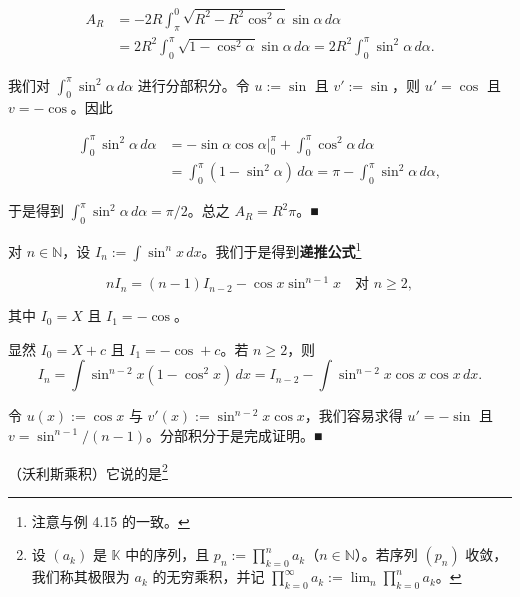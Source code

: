 \begin{example}
\begin{equation*}
\begin{aligned}
A_R &= -2R \int_{\pi}^{0} \sqrt{R^2 - R^2 \cos^2 \alpha} \sin \alpha \, d\alpha \\ &= 2R^2 \int_{0}^{\pi} \sqrt{1 - \cos^2 \alpha} \sin \alpha \, d\alpha = 2R^2 \int_{0}^{\pi} \sin^2 \alpha \, d\alpha .
\end{aligned}
\end{equation*}

我们对 $ \int_{0}^{\pi} \sin^2 \alpha \, d\alpha $ 进行分部积分。令 $ u := \sin $ 且 $ v' := \sin $，则 $ u' = \cos $ 且 $ v = -\cos $。因此

\begin{equation*}
\begin{aligned}
\int_{0}^{\pi} \sin^2 \alpha \, d\alpha &= -\sin \alpha \cos \alpha \big|_{0}^{\pi} + \int_{0}^{\pi} \cos^2 \alpha \, d\alpha \\ &= \int_{0}^{\pi} (1 - \sin^2 \alpha) \, d\alpha = \pi - \int_{0}^{\pi} \sin^2 \alpha \, d\alpha ,
\end{aligned}
\end{equation*}

于是得到 $ \int_{0}^{\pi} \sin^2 \alpha \, d\alpha = \pi/2 $。总之 $ A_R = R^2 \pi $。\nobreak\hspace{0.35em}■

\begin{items}
\item[（c）]

对 $ n \in \mathbb{N} $，设 $ I_n := \int \sin^n x \, dx $。我们于是得到\textbf{递推公式}\footnote{注意与例 4.15 的一致。}

\begin{equation}
n I_n = (n-1) I_{n-2} - \cos x \sin^{n-1} x \quad \text{对 } n \ge 2 ,\tag{5.3}
\end{equation}

其中 $ I_0 = X $ 且 $ I_1 = -\cos $。

\proofhead
显然 $ I_0 = X + c $ 且 $ I_1 = -\cos + c $。若 $ n \ge 2 $，则
\[
I_n = \int \sin^{n-2} x (1 - \cos^2 x) \, dx = I_{n-2} - \int \sin^{n-2} x \cos x \cos x \, dx .
\]

令 $ u(x) := \cos x $ 与 $ v'(x) := \sin^{n-2} x \cos x $，我们容易求得 $ u' = -\sin $ 且 $ v = \sin^{n-1}/(n-1) $。分部积分于是完成证明。\nobreak\hspace{0.35em}■

\item[（d）]

（沃利斯乘积）它说的是\footnote{设 $ (a_k) $ 是 $ \mathbb{K} $ 中的序列，且 $ p_n := \prod_{k=0}^{n} a_k $（$ n \in \mathbb{N} $）。若序列 $ (p_n) $ 收敛，我们称其极限为 $ a_k $ 的无穷乘积，并记 $ \prod_{k=0}^{\infty} a_k := \lim_{n} \prod_{k=0}^{n} a_k $。}


\end{items}
\end{example}
